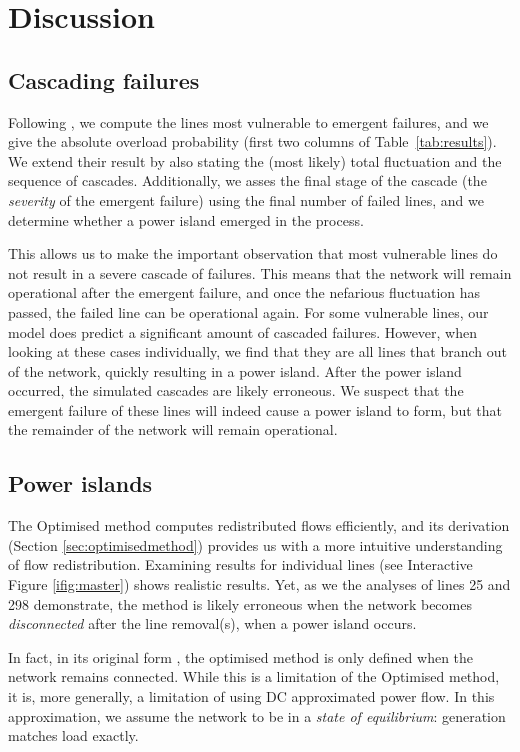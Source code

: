 \documentclass[main.tex]{subfiles}
\begin{document}
\section{Discussion}
\subsection{Cascading failures}\label{sec:discussioncasc}
Following \cite{Nesti2018emergentfailures}, we compute the lines most vulnerable to emergent failures, and we give the absolute overload probability (first two columns of Table~\ref{tab:results}). We extend their result by also stating the (most likely) total fluctuation and the sequence of cascades. Additionally, we asses the final stage of the cascade (\ie the \emph{severity} of the emergent failure) using the final number of failed lines, and we determine whether a power island emerged in the process.

This allows us to make the important observation that most vulnerable lines do not result in a severe cascade of failures. This means that the network will remain operational after the emergent failure, and once the nefarious fluctuation has passed, the failed line can be operational again. For some vulnerable lines, our model does predict a significant amount of cascaded failures. However, when looking at these cases individually, we find that they are all lines that branch out of the network, quickly resulting in a power island. After the power island occurred, the simulated cascades are likely erroneous. We suspect that the emergent failure of these lines will indeed cause a power island to form, but that the remainder of the network will remain operational.

\subsection{Power islands}\label{sec:discussionpowerislands}
The Optimised method computes redistributed flows efficiently, and its derivation (Section \ref{sec:optimisedmethod}) provides us with a more intuitive understanding of flow redistribution. Examining results for individual lines (\eg see Interactive Figure \ref{ifig:master}) shows realistic results. Yet, as we the analyses of lines 25 and 298 demonstrate, the method is likely erroneous when the network becomes \emph{disconnected} after the line removal(s), \ie when a power island occurs.

In fact, in its original form \citep{Ronellenfitsch2017}, the optimised method is only defined when the network remains connected.
While this is a limitation of the Optimised method, it is, more generally, a limitation of using DC approximated power flow. In this approximation, we assume the network to be in a \emph{state of equilibrium}: generation matches load exactly. 
\end{document}
